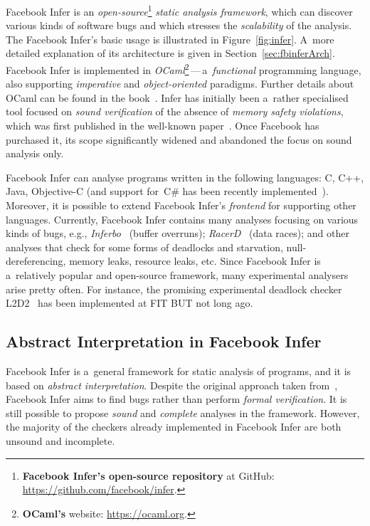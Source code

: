 Facebook Infer is an \emph{open-source}\footnote{\textbf{Facebook Infer's open-source repository} at GitHub: \url{https://github.com/facebook/infer}.} \emph{static analysis framework}, which can discover various kinds of software bugs and which stresses the \emph{scalability} of the analysis. The Facebook Infer's basic usage is illustrated in Figure~\ref{fig:infer}. A~more detailed explanation of its architecture is given in Section~\ref{sec:fbinferArch}. Facebook Infer is implemented in \emph{OCaml}\footnote{\textbf{OCaml's} website: \url{https://ocaml.org}.}\,---\,a~\emph{functional} programming language, also supporting \emph{imperative} and \emph{object-oriented} paradigms. Further details about OCaml can be found in the book~\cite{realWorldOCaml}. Infer has initially been a~rather specialised tool focused on \emph{sound verification} of the absence of \emph{memory safety violations}, which was first published in the well-known paper~\cite{inferBiabduction}. Once Facebook has purchased it, its scope significantly widened and abandoned the focus on sound analysis only.

Facebook Infer can analyse programs written in the following languages: C, C++, Java, Objective-C (and support for~C\# has been recently implemented~\cite{inferCSharp}). Moreover, it is possible to extend Facebook Infer's \emph{frontend} for supporting other languages. Currently, Facebook Infer contains many analyses focusing on various kinds of bugs, e.g., \emph{Inferbo}~\cite{inferboOnline} (buffer overruns); \emph{RacerD}~\cite{racerD, racerDOnline, staticRaceDetectorTruePositives} (data races); and other analyses that check for some forms of deadlocks and starvation, null-dereferencing, memory leaks, resource leaks, etc. Since Facebook Infer is a~relatively popular and open-source framework, many experimental analysers arise pretty often. For instance, the promising experimental deadlock checker L2D2~\cite{marcinBP} has been implemented at FIT BUT not long ago.

\subsection{Abstract Interpretation in Facebook Infer}
\label{sec:fbinferAI}

Facebook Infer is a~general framework for static analysis of programs, and it is based on \emph{abstract interpretation}. Despite the original approach taken from~\cite{inferBiabduction}, Facebook Infer aims to find bugs rather than perform \emph{formal verification}. It is still possible to propose \emph{sound} and \emph{complete} analyses in the framework. However, the majority of the checkers already implemented in Facebook Infer are both unsound and incomplete.

